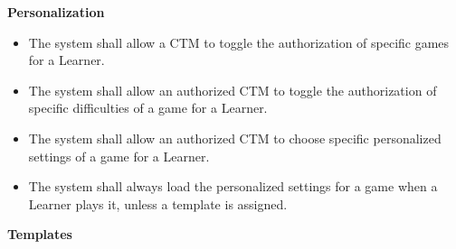 \documentclass[12pt]{article}
\newcounter{reqnumP} %
\begin{document}
\noindent \textbf{Personalization}
\noindent \begin{itemize}
  \setcounter{reqnumP}{0}

  \item[\refstepcounter{reqnumP}\thereqnumP \label{FR-PERS-1}:] The system shall allow a CTM to toggle the authorization of specific games for a Learner.

  \item[\refstepcounter{reqnumP}\thereqnumP \label{FR-PERS-2}:] The system shall allow an authorized CTM to toggle the authorization of specific difficulties of a game for a Learner.

  \item[\refstepcounter{reqnumP}\thereqnumP \label{FR-PERS-3}:] The system shall allow an authorized CTM to choose specific personalized settings of a game for a Learner.

  \item[\refstepcounter{reqnumP}\thereqnumP \label{FR-PERS-4}:] The system shall always load the personalized settings for a game when a Learner plays it, unless a template is assigned.
\end{itemize}
\noindent \textbf{Templates}
\end{document}
